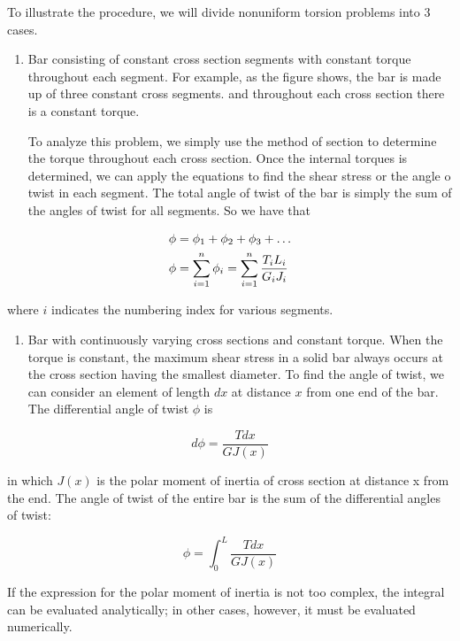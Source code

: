 \documentclass[a4paper,openany,12pt]{book}
\begin{document}
To illustrate the procedure, we will divide nonuniform torsion problems
into 3 cases.

\begin{enumerate}
\item Bar consisting of constant cross section segments with constant
torque throughout each segment. For example, as the figure shows, the
bar is made up of three constant cross segments. and throughout each
cross section there is a constant torque.

To analyze this problem, we simply use the method of section to
determine the torque throughout each cross section. Once the internal
torques is determined, we can apply the equations to find the shear
stress or the angle o twist in each segment. The total angle of twist
of the bar is simply the sum of the angles of twist for all segments.
So we have that
\end{enumerate}


$$\begin{gathered}
         \phi  = \phi_1 + \phi_2 + \phi_3 +  \ldots  \hfill \\
         \phi  = \sum\limits_{i = 1}^n \phi_i = \sum\limits_{i = 1}^n \dfrac{T_iL_i}{G_iJ_i}  \hfill \\ 
       \end{gathered}$$

where \(i\) indicates the numbering index for various segments.

\begin{enumerate}
\item Bar with continuously varying cross sections and constant torque.
When the torque is constant, the maximum shear stress in a solid bar
always occurs at the cross section having the smallest diameter. To
find the angle of twist, we can consider an element of length \(dx\) at
distance \(x\) from one end of the bar. The differential angle of twist
\(\phi\) is
\end{enumerate}


$$d\phi  = \frac{Tdx}{GJ(x)}$$

in which \(J(x)\) is the polar moment of inertia of cross section at
distance x from the end. The angle of twist of the entire bar is the
sum of the differential angles of twist:

$$\phi  = \int_0^L \frac{Tdx}{GJ(x)}$$

If the expression for the polar moment of inertia is not too complex,
the integral can be evaluated analytically; in other cases, however,
it must be evaluated numerically.
\end{document}
